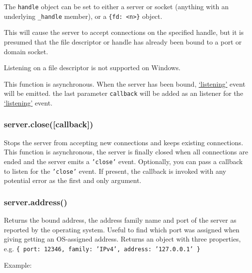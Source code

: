 The \texttt{handle} object can be set to either a server or socket
(anything with an underlying \texttt{\_handle} member), or a
\texttt{\{fd: \textless{}n\textgreater{}\}} object.

This will cause the server to accept connections on the specified
handle, but it is presumed that the file descriptor or handle has
already been bound to a port or domain socket.

Listening on a file descriptor is not supported on Windows.

This function is asynchronous. When the server has been bound,
\hyperref[netux5feventux5flistening]{`listening'} event will be emitted.
the last parameter \texttt{callback} will be added as an listener for
the \hyperref[netux5feventux5flistening]{`listening'} event.

\subsubsection{server.close({[}callback{]})}\label{server.closecallback}

Stops the server from accepting new connections and keeps existing
connections. This function is asynchronous, the server is finally closed
when all connections are ended and the server emits a \texttt{'close'}
event. Optionally, you can pass a callback to listen for the
\texttt{'close'} event. If present, the callback is invoked with any
potential error as the first and only argument.

\subsubsection{server.address()}\label{server.address}

Returns the bound address, the address family name and port of the
server as reported by the operating system. Useful to find which port
was assigned when giving getting an OS-assigned address. Returns an
object with three properties, e.g.
\texttt{\{ port: 12346, family: 'IPv4', address: '127.0.0.1' \}}

Example:

\begin{Shaded}
\end{Shaded}

